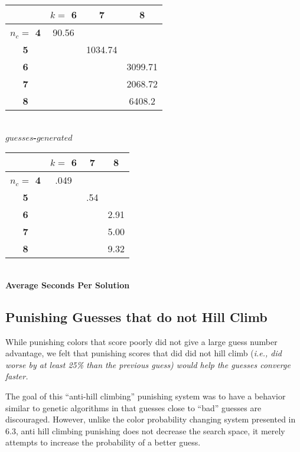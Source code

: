 \documentclass[11pt,twocolumn]{article}
\begin{document}
\begin{center}
\begin{tabular}{|c|c|c|c|}
\hline
        &\bf $k= $ 6 &\bf 7 &\bf 8 \\
\hline
\bf $n_c = $ 4 & 90.56   &   &   \\
\hline
\bf 5       &       & 1034.74&   \\
\hline
\bf 6       &       &   & 3099.71 \\
\hline
\bf 7       &       &   & 2068.72 \\
\hline
\bf 8       &       &   & 6408.2 \\
\hline
\end{tabular}\\
\bf $guesses$-$generated$ \rm
\end{center}



\begin{center}
\begin{tabular}{|c|c|c|c|}
\hline
        &\bf $k= $ 6 &\bf 7 &\bf 8 \\
\hline
\bf $n_c = $ 4 & .049   &   &   \\
\hline
\bf 5       &       & .54&   \\
\hline
\bf 6       &       &   & 2.91 \\
\hline
\bf 7       &       &   & 5.00 \\
\hline
\bf 8       &       &   & 9.32 \\
\hline
\end{tabular}\\
\bf Average Seconds Per Solution  \rm
\end{center}


\subsection{Punishing Guesses that do not Hill Climb}

While punishing colors that score poorly did not give a large guess number advantage, we felt that punishing scores that did did not hill climb (\em i.e., \rm did worse by at least 25\% than the previous guess) would help the guesses converge faster. 

The goal of this ``anti-hill climbing'' punishing system was to have a behavior similar to genetic algorithms in that guesses close to ``bad'' guesses are discouraged. However, unlike the color probability changing system presented in 6.3, anti hill climbing punishing does not decrease the search space, it merely attempts to increase the probability of a better guess. 
\end{document}
